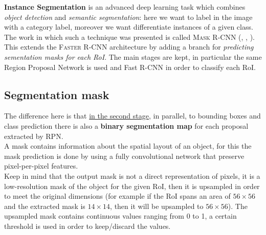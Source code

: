 \textbf{Instance Segmentation} is an advanced deep learning task which combines \textit{object detection} and \textit{semantic segmentation}: here we want to label in the image with a category label, moreover we want differentiate instances of a given class. \\
The work in which such a technique was presented is called \textsc{Mask R-CNN} (\citeauthor{he2017mask}, , \cite{he2017mask}). This extends the \textsc{Faster R-CNN} architecture by adding a branch for \textit{predicting sementation masks for each RoI}. The main stages are kept, in particular the same Region Proposal Network is used and Fast R-CNN in order to classify each RoI. 

\subsection{Segmentation mask}
The difference here is that \underline{in the second stage}, in parallel, to bounding boxes and class prediction there is also a \textbf{binary segmentation map} for each proposal extracted by RPN. \\
A mask contains information about the spatial layout of an object, for this the mask prediction is done by using a fully convolutional network that preserve pixel-per-pixel features.\\
Keep in mind that the output mask is not a direct representation of pixels, it is a low-resolution mask of the object for the given RoI, then it is upsampled in order to meet the original dimensions (for example if the RoI spans an area of $56\times56$ and the extracted mask is $14\times14$, then it will be upsampled to $56\times56$). The upsampled mask contains continuous values ranging from 0 to 1, a certain threshold is used in order to keep/discard the values.

